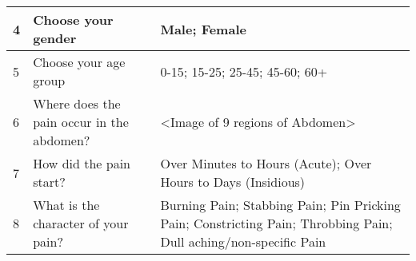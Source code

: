 \begin{table}[htbp]
{\begin{tabular}{|p{1cm}|p{5cm}|p{8cm}|}
            4       & Choose your gender                                                                                                                     & Male; Female                                                                                                                                                                                                                                                                                                                            \\ \hline
            5       & Choose your age group                                                                                                                  & 0-15; 15-25; 25-45; 45-60; 60+                                                                                                                                                                                                                                                                                                          \\ \hline
            6       & Where does the pain occur in the abdomen?                                                                                              & \textless{}Image of 9 regions of Abdomen\textgreater{}                                                                                                                                                                                                                                                                                  \\ \hline
            7       & How did the pain start?                                                                                                                & Over Minutes to Hours (Acute); Over Hours to Days (Insidious)                                                                                                                                                                                                                                                                           \\ \hline
            8       & What is the character of your pain?                                                                                                    & Burning Pain; Stabbing Pain; Pin Pricking Pain; Constricting Pain; Throbbing Pain; Dull aching/non-specific Pain                                                                                                                                                                                                                        \\ \hline

\end{tabular}}
\end{table}
